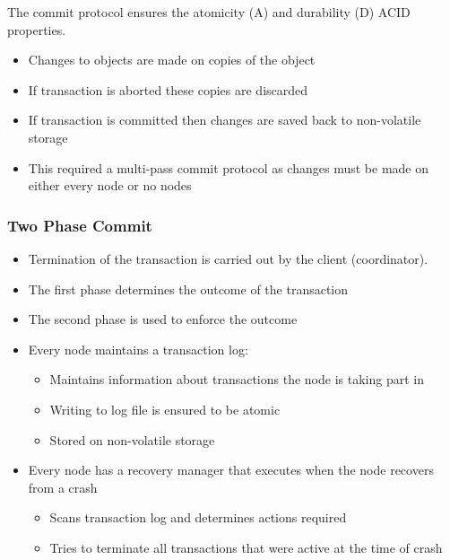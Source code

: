 \documentclass[a4paper]{article}
\begin{document}
The commit protocol ensures the atomicity (A) and durability (D) ACID
properties.

\begin{itemize}
  \item Changes to objects are made on copies of the object
  \item If transaction is aborted these copies are discarded
  \item If transaction is committed then changes are saved back to non-volatile
        storage
  \item This required a multi-pass commit protocol as changes must be made on
        either every node or no nodes
\end{itemize}

\subsubsection{Two Phase Commit}

\begin{itemize}
  \item Termination of the transaction is carried out by the client
        (coordinator).
  \item The first phase determines the outcome of the transaction
  \item The second phase is used to enforce the outcome
  \item Every node maintains a transaction log:
    \begin{itemize}
      \item Maintains information about transactions the node is taking part in
      \item Writing to log file is ensured to be atomic
      \item Stored on non-volatile storage
    \end{itemize}
  \item Every node has a recovery manager that executes when the node recovers
        from a crash
    \begin{itemize}
      \item Scans transaction log and determines actions required
      \item Tries to terminate all transactions that were active at the time of
            crash
    \end{itemize}
\end{itemize}

\end{document}
